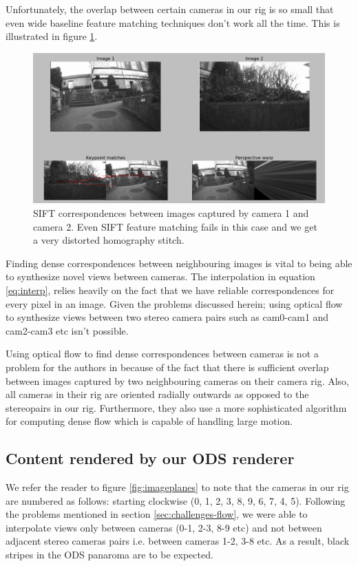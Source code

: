 \documentclass[10pt,twocolumn,letterpaper]{article}
\begin{document}
Unfortunately, the overlap between certain cameras in our rig is so small that even wide baseline feature matching techniques don't work all the time. This is illustrated in figure \ref{fig:homo-12}.
\begin{figure}
\centering
\includegraphics[width=\linewidth]{../results/homography-stitch/cam1-cam2-bad.png}
\caption{SIFT correspondences between images captured by camera 1 and camera 2. Even SIFT feature matching fails in this case and we get a very distorted homography stitch.}
\label{fig:homo-12}
\end{figure}

Finding dense correspondences between neighbouring images is vital to being able to synthesize novel views between cameras. The interpolation in equation \ref{eq:interp}, relies heavily on the fact that we have reliable correspondences for every pixel in an image. 
Given the problems discussed herein; using optical flow to synthesize views between two stereo camera pairs such as cam0-cam1 and cam2-cam3 etc isn't possible. 

Using optical flow to find dense correspondences between cameras is not a problem for the authors in \cite{jump16} because of the fact that there is sufficient overlap between images captured by two neighbouring cameras on their camera rig. Also, all cameras in their rig are oriented radially outwards as opposed to the stereopairs in our rig. Furthermore, they also use a more sophisticated algorithm for computing dense flow which is capable of handling large motion.

\subsection{Content rendered by our ODS renderer}
\label{ods-results}
We refer the reader to figure \ref{fig:imageplanes} to note that the cameras in our rig are numbered as follows: starting clockwise (0, 1, 2, 3, 8, 9, 6, 7, 4, 5). Following the problems mentioned in section \ref{sec:challenges-flow}, we were able to interpolate views only between cameras (0-1, 2-3, 8-9 etc) and not between adjacent stereo cameras pairs i.e. between cameras 1-2, 3-8 etc. As a result, black stripes in the ODS panaroma are to be expected. 
\end{document}
